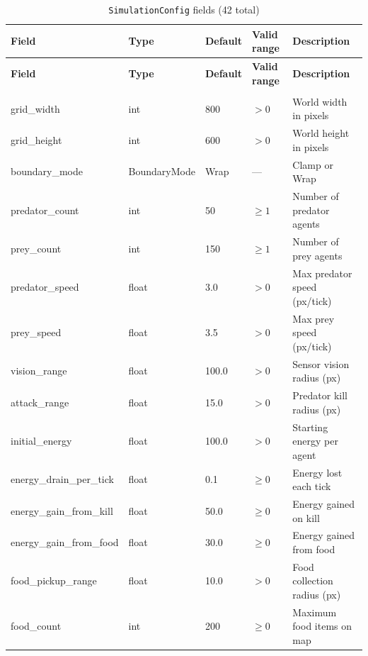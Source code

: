 \begin{longtable}[l]{@{}>{\ttfamily\small}p{3.2cm}>{\ttfamily\small}p{1.8cm}p{1.2cm}p{2cm}p{4.8cm}@{}}
\caption{\texttt{SimulationConfig} fields (42 total)}
\label{tab:config}\\
\toprule
\textbf{Field} & \textbf{Type} & \textbf{Default} & \textbf{Valid range} & \textbf{Description} \\
\midrule
\endfirsthead
\toprule
\textbf{Field} & \textbf{Type} & \textbf{Default} & \textbf{Valid range} & \textbf{Description} \\
\midrule
\endhead
\midrule \multicolumn{5}{r}{\small(continued on next page)} \\
\endfoot
\bottomrule
\endlastfoot
grid\_width            & int    & 800    & $>0$          & World width in pixels \\
grid\_height           & int    & 600    & $>0$          & World height in pixels \\
boundary\_mode         & BoundaryMode & Wrap & —           & Clamp or Wrap \\
predator\_count        & int    & 50     & $\ge 1$       & Number of predator agents \\
prey\_count            & int    & 150    & $\ge 1$       & Number of prey agents \\
predator\_speed        & float  & 3.0    & $>0$          & Max predator speed (px/tick) \\
prey\_speed            & float  & 3.5    & $>0$          & Max prey speed (px/tick) \\
vision\_range          & float  & 100.0  & $>0$          & Sensor vision radius (px) \\
attack\_range          & float  & 15.0   & $>0$          & Predator kill radius (px) \\
initial\_energy        & float  & 100.0  & $>0$          & Starting energy per agent \\
energy\_drain\_per\_tick& float & 0.1    & $\ge 0$       & Energy lost each tick \\
energy\_gain\_from\_kill& float & 50.0   & $\ge 0$       & Energy gained on kill \\
energy\_gain\_from\_food& float & 30.0   & $\ge 0$       & Energy gained from food \\
food\_pickup\_range    & float  & 10.0   & $>0$          & Food collection radius (px) \\
food\_count            & int    & 200    & $\ge 0$       & Maximum food items on map \\

\end{longtable}
